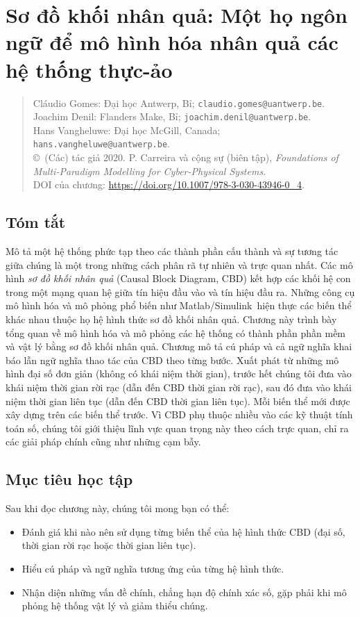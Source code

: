 \chapter{Sơ đồ khối nhân quả: Một họ ngôn ngữ để mô hình hóa nhân quả các hệ thống thực-ảo}
\begin{quote}\small
Cláudio Gomes: Đại học Antwerp, Bỉ; \texttt{claudio.gomes@uantwerp.be}.\\
Joachim Denil: Flanders Make, Bỉ; \texttt{joachim.denil@uantwerp.be}.\\
Hans Vangheluwe: Đại học McGill, Canada; \texttt{hans.vangheluwe@uantwerp.be}.\\
\copyright\ (Các) tác giả 2020. P. Carreira và cộng sự (biên tập),
\emph{Foundations of Multi-Paradigm Modelling for Cyber-Physical Systems}.\\
DOI của chương: \url{https://doi.org/10.1007/978-3-030-43946-0_4}.
\end{quote}

\section*{Tóm tắt}
Mô tả một hệ thống phức tạp theo các thành phần cấu thành và sự tương tác giữa chúng là một trong những cách phân rã tự nhiên và trực quan nhất. Các mô hình \emph{sơ đồ khối nhân quả} (Causal Block Diagram, CBD) kết hợp các khối hệ con trong một mạng quan hệ giữa tín hiệu đầu vào và tín hiệu đầu ra. Những công cụ mô hình hóa và mô phỏng phổ biến như Matlab/Simulink\textregistered\ hiện thực các biến thể khác nhau thuộc họ hệ hình thức sơ đồ khối nhân quả. Chương này trình bày tổng quan về mô hình hóa và mô phỏng các hệ thống có thành phần phần mềm và vật lý bằng sơ đồ khối nhân quả. Chương mô tả cú pháp và cả ngữ nghĩa khai báo lẫn ngữ nghĩa thao tác của CBD theo từng bước. Xuất phát từ những mô hình đại số đơn giản (không có khái niệm thời gian), trước hết chúng tôi đưa vào khái niệm thời gian rời rạc (dẫn đến CBD thời gian rời rạc), sau đó đưa vào khái niệm thời gian liên tục (dẫn đến CBD thời gian liên tục). Mỗi biến thể mới được xây dựng trên các biến thể trước. Vì CBD phụ thuộc nhiều vào các kỹ thuật tính toán số, chúng tôi giới thiệu lĩnh vực quan trọng này theo cách trực quan, chỉ ra các giải pháp chính cũng như những cạm bẫy.

\section*{Mục tiêu học tập}
Sau khi đọc chương này, chúng tôi mong bạn có thể:
\begin{itemize}
\item Đánh giá khi nào nên sử dụng từng biến thể của hệ hình thức CBD (đại số, thời gian rời rạc hoặc thời gian liên tục).
\item Hiểu cú pháp và ngữ nghĩa tương ứng của từng hệ hình thức.
\item Nhận diện những vấn đề chính, chẳng hạn độ chính xác số, gặp phải khi mô phỏng hệ thống vật lý và giảm thiểu chúng.
\end{itemize}

